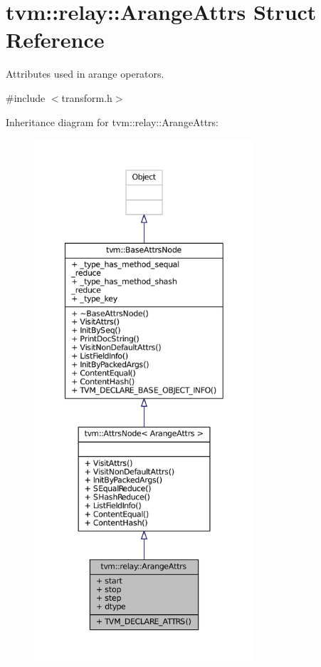 \hypertarget{structtvm_1_1relay_1_1ArangeAttrs}{}\section{tvm\+:\+:relay\+:\+:Arange\+Attrs Struct Reference}
\label{structtvm_1_1relay_1_1ArangeAttrs}


Attributes used in arange operators.  




{\ttfamily \#include $<$transform.\+h$>$}



Inheritance diagram for tvm\+:\+:relay\+:\+:Arange\+Attrs\+:
\nopagebreak
\begin{figure}[H]
\begin{center}
\leavevmode
\includegraphics[height=550pt]{structtvm_1_1relay_1_1ArangeAttrs__inherit__graph}
\end{center}
\end{figure}


